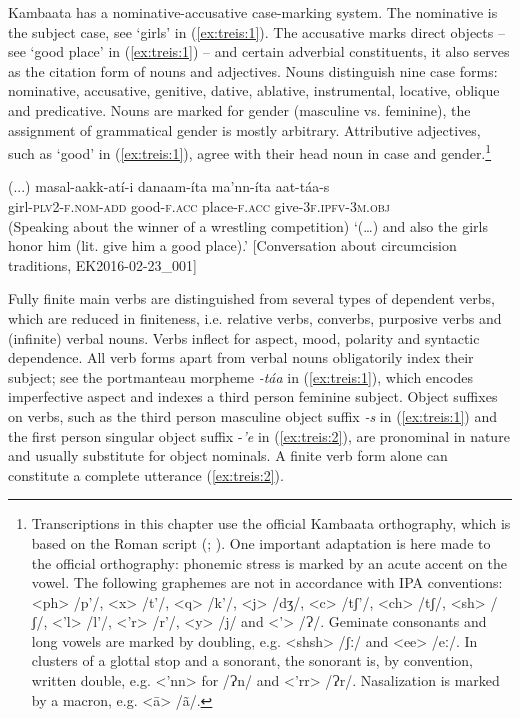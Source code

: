 \documentclass[output=paper]{langscibook}
\begin{document}
Kambaata has a nominative-accusative case-marking system. The nominative is the subject case, see ‘girls’ in (\ref{ex:treis:1}). The accusative marks direct objects – see ‘good place’ in (\ref{ex:treis:1}) – and certain adverbial constituents, it also serves as the citation form of nouns and adjectives. Nouns distinguish nine case forms: nominative, accusative, genitive, dative, ablative, instrumental, locative, oblique and predicative. Nouns are marked for gender (masculine vs. feminine), the assignment of grammatical gender is mostly arbitrary. Attributive adjectives, such as ‘good’ in (\ref{ex:treis:1}), agree with their head noun in case and gender.\footnote{Transcriptions in this chapter use the official Kambaata orthography, which is based on the Roman script (\citealt[73-80]{Treis2008}; \citealt{Alemu2016}). One important adaptation is here made to the official orthography: phonemic stress is marked by an acute accent on the vowel. The following graphemes are not in accordance with IPA conventions: <ph> /p’/, <x> /t’/, <q> /k’/, <j> /dʒ/, <c> /tʃ’/, <ch> /tʃ/, <sh> /ʃ/, <’l> /l’/, <’r> /r’/, <y> /j/ and <’> /Ɂ/. Geminate consonants and long vowels are marked by doubling, e.g. <shsh> /ʃː/ and <ee> /eː/. In clusters of a glottal stop and a sonorant, the sonorant is, by convention, written double, e.g. <’nn> for /Ɂn/ and <’rr> /Ɂr/. Nasalization is marked by a macron, e.g. <ā> /ã/.}

\ea\label{ex:treis:1} 
\gll (...) masal-aakk-atí-i danaam-íta ma’nn-íta aat-táa-s\\
     {} girl-\textsc{plv2-f.nom-add} good-\textsc{f.acc} place-\textsc{f.acc} give-3\textsc{f.ipfv-3m.obj}\\
\glt (Speaking about the winner of a wrestling competition) ‘(…) and also the girls honor him (lit. give him a good place).’ [Conversation about circumcision traditions, EK2016-02-23\_001]
\z

Fully finite main verbs are distinguished from several types of dependent verbs, which are reduced in finiteness, i.e. relative verbs, converbs, purposive verbs and (infinite) verbal nouns. Verbs inflect for aspect, mood, polarity and syntactic dependence. All verb forms apart from verbal nouns obligatorily index their subject; see the portmanteau morpheme \textit{-táa} in (\ref{ex:treis:1}), which encodes imperfective aspect and indexes a third person feminine subject. Object suffixes on verbs, such as the third person masculine object suffix \textit{-s} in (\ref{ex:treis:1}) and the first person singular object suffix \nobreakdash-\textit{’e} in (\ref{ex:treis:2}), are pronominal in nature and usually substitute for object nominals. A finite verb form alone can constitute a complete utterance (\ref{ex:treis:2}).
\end{document}
